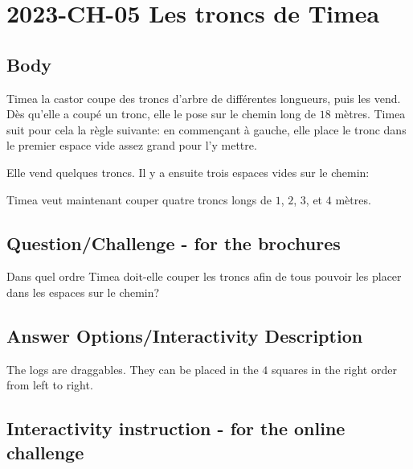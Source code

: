 \documentclass[a4paper,11pt]{report}
\newcommand{\taskGraphicsFolder}{..}
\begin{document}
\section*{\centering{} 2023-CH-05 Les troncs de Timea}


\subsection*{Body}

Timea la castor coupe des troncs d’arbre de différentes longueurs, puis les vend.
Dès qu’elle a coupé un tronc, elle le pose sur le chemin long de $18$ mètres.
Timea suit pour cela la règle suivante: en commençant à gauche, elle place le tronc dans le premier espace vide assez grand pour l’y mettre.

Elle vend quelques troncs. Il y a ensuite trois espaces vides sur le chemin:

{\centering%
\par}

Timea veut maintenant couper quatre troncs longs de $1$, $2$, $3$, et $4$ mètres.

{\em


\subsection*{Question/Challenge - for the brochures}

Dans quel ordre Timea doit-elle couper les troncs afin de tous pouvoir les placer dans les espaces sur le chemin?

{\centering%
\par}

}

\begingroup
\renewcommand{\arraystretch}{1.5}
\subsection*{Answer Options/Interactivity Description}

The logs are draggables. They can be placed in the $4$ squares in the right order from left to right.

\endgroup

\subsection*{Interactivity instruction - for the online challenge}
\end{document}
